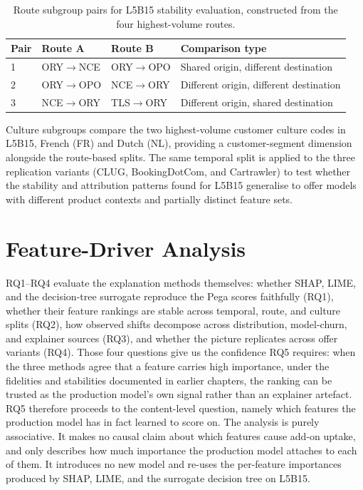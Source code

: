 \documentclass[oneside]{memoir} %
\begin{document}
\begin{table}[ht]
\caption{Route subgroup pairs for L5B15 stability evaluation, constructed from the four 
highest-volume routes.}
\label{tab:route_pairs}
\centering
\begin{tabular}{llll}
\toprule
Pair & Route A & Route B & Comparison type \\
\midrule
1 & ORY$\to$NCE & ORY$\to$OPO & Shared origin, different destination \\
2 & ORY$\to$OPO & NCE$\to$ORY & Different origin, different destination \\
3 & NCE$\to$ORY & TLS$\to$ORY & Different origin, shared destination \\
\bottomrule
\end{tabular}
\end{table}

Culture subgroups compare the two highest-volume customer culture codes in L5B15, French (FR) and Dutch (NL), providing a customer-segment dimension alongside the route-based splits. The same temporal split is applied to the three replication variants (CLUG, BookingDotCom, and Cartrawler) to test whether the stability and attribution patterns found for L5B15 generalise to offer models with different product contexts and partially distinct feature sets.

\section{Feature-Driver Analysis} \label{sec:rq5_method}

RQ1--RQ4 evaluate the explanation methods themselves: whether SHAP, LIME, and the decision-tree surrogate reproduce the Pega scores faithfully (RQ1), whether their feature rankings are stable across temporal, route, and culture splits (RQ2), how observed shifts decompose across distribution, model-churn, and explainer sources (RQ3), and whether the picture replicates across offer variants (RQ4). Those four questions give us the confidence RQ5 requires: when the three methods agree that a feature carries high importance, under the fidelities and stabilities documented in earlier chapters, the ranking can be trusted as the production model's own signal rather than an explainer artefact. RQ5 therefore proceeds to the content-level question, namely which features the production model has in fact learned to score on. The analysis is purely associative. It makes no causal claim about which features cause add-on uptake, and only describes how much importance the production model attaches to each of them. It introduces no new model and re-uses the per-feature importances produced by SHAP, LIME, and the surrogate decision tree on L5B15.
\end{document}
